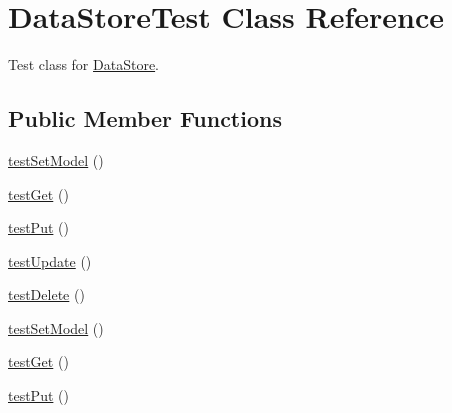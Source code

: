 \hypertarget{class_data_store_test}{
\section{DataStoreTest Class Reference}
\label{class_data_store_test}
}


Test class for \hyperlink{class_data_store}{DataStore}.  


\subsection*{Public Member Functions}
\begin{DoxyCompactItemize}
\item 
\hyperlink{class_data_store_test_af24b63b987b9ef29ba6abc7e09342b0e}{testSetModel} ()
\item 
\hyperlink{class_data_store_test_a87054185766c33e18861850032ad649a}{testGet} ()
\item 
\hyperlink{class_data_store_test_a029b5c4d2f0cf0433023c14a2aaa44c7}{testPut} ()
\item 
\hyperlink{class_data_store_test_a0dafcbb4eee758f21288eb51775666dc}{testUpdate} ()
\item 
\hyperlink{class_data_store_test_aa99d0c41c669c5b1f03e263f59f975fd}{testDelete} ()
\item 
\hyperlink{class_data_store_test_af24b63b987b9ef29ba6abc7e09342b0e}{testSetModel} ()
\item 
\hyperlink{class_data_store_test_a87054185766c33e18861850032ad649a}{testGet} ()
\item 
\hyperlink{class_data_store_test_a029b5c4d2f0cf0433023c14a2aaa44c7}{testPut} ()
\end{DoxyCompactItemize}
